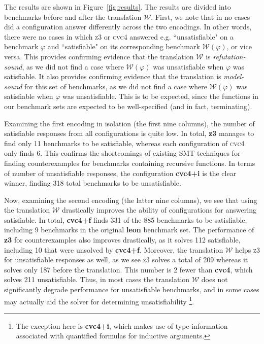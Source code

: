 \documentclass[runningheads,a4paper]{llncs}
\newcommand{\cvc}{\textsc{cvc}{\small 4}\xspace}
\newcommand{\ziii}{\textsc{z}{\small 3}\xspace}
\newcommand{\conv}{\mathcal{W}}
\begin{document}
The results are shown in Figure~\ref{fig:results}.
The results are divided into benchmarks before and after the translation $\conv$.
First, we note that in no cases did a configuration answer differently across the two encodings.
In other words, there were no cases in which \ziii or \cvc answered e.g. ``unsatisfiable" on a benchmark $\varphi$
and ``satisfiable" on its corresponding benchmark $\conv( \varphi )$, or vice versa.
This provides confirming evidence that the translation $\conv$ is \emph{refutation-sound},
as we did not find a case where $\conv( \varphi )$ was unsatisfiable when $\varphi$ was satisfiable.
It also provides confirming evidence that the translation is \emph{model-sound} for this set of benchmarks,
as we did not find a case where $\conv( \varphi )$ was satisfiable when $\varphi$ was unsatisfiable.
This is to be expected, since the functions in our benchmark sets are expected to be well-specified (and in fact, terminating).

Examining the first encoding in isolation (the first nine columns),
the number of satisfiable responses from all configurations is quite low.
In total, {\bf z3} manages to find only 11 benchmarks to be satisfiable,
whereas each configuration of \cvc only finds 6.
This confirms the shortcomings of existing SMT techniques for finding counterexamples for benchmarks containing recursive functions.
In terms of number of unsatisfiable responses,
the configuration {\bf cvc4+i} is the clear winner, finding 318 total benchmarks to be unsatisfiable.

Now, examining the second encoding (the latter nine columns), 
we see that using the translation $\conv$ drastically improves the ability of configurations for answering satisfiable.
In total, {\bf cvc4+f} finds 331 of the 885 benchmarks to be satisfiable, including 9 benchmarks in the original {\bf leon} benchmark set.
The performance of {\bf z3} for counterexamples also improves drastically, as it solves 112 satisfiable,
including 10 that were unsolved by {\bf cvc4+f}.
Moreover, the translation $\conv$ helps \ziii for unsatisfiable responses as well,
as we see \ziii solves a total of 209 whereas it solves only 187 before the translation.
This number is 2 fewer than {\bf cvc4}, which solves 211 unsatisfiable.
Thus, in most cases the translation $\conv$ does not significantly degrade performance for unsatisfiable benchmarks,
and in some cases may actually aid the solver for determining unsatisfiability
\footnote{The exception here is {\bf cvc4+i}, which makes use of type information associated with quantified formulas for inductive arguments.}.
\end{document}
